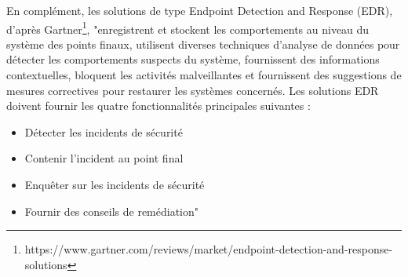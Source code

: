 En complément, les solutions de type Endpoint Detection and Response (EDR), d'après Gartner\footnote{https://www.gartner.com/reviews/market/endpoint-detection-and-response-solutions}, "enregistrent et stockent les comportements au niveau du système des points finaux, utilisent diverses techniques d'analyse de données pour détecter les comportements suspects du système, fournissent des informations contextuelles, bloquent les activités malveillantes et fournissent des suggestions de mesures correctives pour restaurer les systèmes concernés. Les solutions EDR doivent fournir les quatre fonctionnalités principales suivantes :
\begin{itemize}
    \item Détecter les incidents de sécurité
    \item Contenir l'incident au point final
    \item Enquêter sur les incidents de sécurité
    \item Fournir des conseils de remédiation"
\end{itemize}


